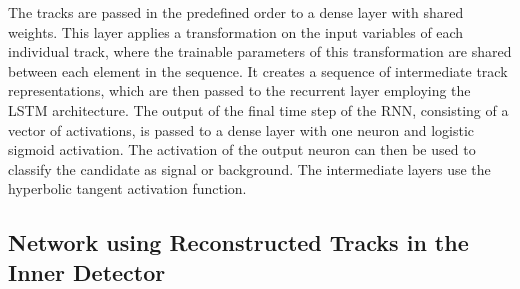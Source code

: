 The tracks are passed in the predefined order to a dense layer with shared
weights. This layer applies a transformation on the input variables of each
individual track, where the trainable parameters of this transformation are
shared between each element in the sequence. It creates a sequence of
intermediate track representations, which are then passed to the recurrent layer
employing the LSTM architecture. The output of the final time step of the RNN,
consisting of a vector of activations, is passed to a dense layer with one
neuron and logistic sigmoid activation. The activation of the output neuron can
then be used to classify the \tauhadvis candidate as signal or background. The
intermediate layers use the hyperbolic tangent activation function.

\subsection{Network using Reconstructed Tracks in the Inner Detector}
\label{sec:rnn_tracks}

